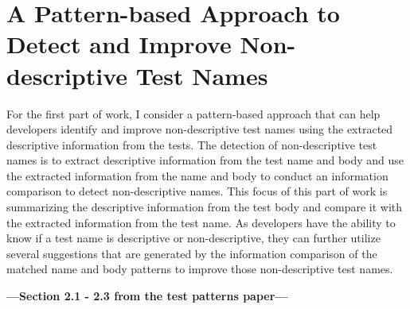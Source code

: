 \section{A Pattern-based Approach to Detect and Improve Non-descriptive Test Names}
\label{sec:test-pattern-section}

For the first part of work, I consider a pattern-based approach that can help developers identify and improve non-descriptive test names using the extracted descriptive information from the tests.
%
The detection of non-descriptive test names is to extract descriptive information from the test name and body and use the extracted information  from the name and body to conduct an information comparison to detect non-descriptive names.
%
This focus of this part of work is summarizing the descriptive information from the test body and compare it with the extracted information from the test name.
%
As developers have the ability to know if a test name is descriptive or non-descriptive, they can further utilize several suggestions that are generated by the information comparison of the matched name and body patterns to improve those non-descriptive test names.

\textbf{---Section 2.1 - 2.3 from the test patterns paper---}





